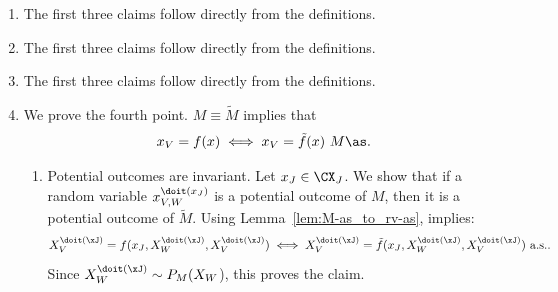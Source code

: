 \begin{enumerate}[label=10.\arabic*]
\begin{ungradedsolution}
        \begin{enumerate}
            \item The first three claims follow directly from the definitions.
            \item The first three claims follow directly from the definitions.
            \item The first three claims follow directly from the definitions.

            \item We prove the fourth point.
            $M \equiv \tilde{M}$ implies that
            \begin{equation}\label{eq:prp:equivalent_scms}
                x_V = f(x) \iff x_V = \tilde{f}(x)\ M\as.
            \end{equation}

            \begin{enumerate}
                \item
                Potential outcomes are invariant.
                Let $x_J \in \CX_J$.
                We show that if a random variable $x^{\doit(x_J)}_{V,W}$ is a potential outcome of $M$, then it is a potential outcome of $\tilde{M}$.
                Using Lemma~\ref{lem:M-as_to_rv-as},  implies:
                $$X_V^{\doit(\xJ)} = f(x_J,X_W^{\doit(\xJ)},X_V^{\doit(\xJ)}) \iff X_V^{\doit(\xJ)} = \tilde{f}(x_J,X_W^{\doit(\xJ)},X_V^{\doit(\xJ)}) \text{ a.s.}.$$
                Since $X_W^{\doit(\xJ)} \sim P_M(X_W$), this proves the claim.


\end{enumerate}
\end{enumerate}
\end{ungradedsolution}
\end{enumerate}
